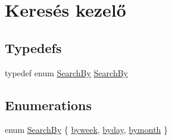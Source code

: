 \hypertarget{group__search}{}\section{Keresés kezelő}
\label{group__search}
\subsection*{Typedefs}
\begin{DoxyCompactItemize}
\item 
typedef enum \hyperlink{group__search_gaf9df49b17c9441844cafc15064ec50fc}{Search\+By} \hyperlink{group__search_ga2ab4e565bcf990b57e010007e13bec43}{Search\+By}
\end{DoxyCompactItemize}
\subsection*{Enumerations}
\begin{DoxyCompactItemize}
\item 
enum \hyperlink{group__search_gaf9df49b17c9441844cafc15064ec50fc}{Search\+By} \{ \hyperlink{group__search_ggaf9df49b17c9441844cafc15064ec50fca22234af7e39a964f41baef92fdd17c14}{byweek}, 
\hyperlink{group__search_ggaf9df49b17c9441844cafc15064ec50fca5efad3bcd6c0ae75087b25e99c9483fa}{byday}, 
\hyperlink{group__search_ggaf9df49b17c9441844cafc15064ec50fca1079e56084842bedf75f880e98175b84}{bymonth}
 \}
\end{DoxyCompactItemize}
